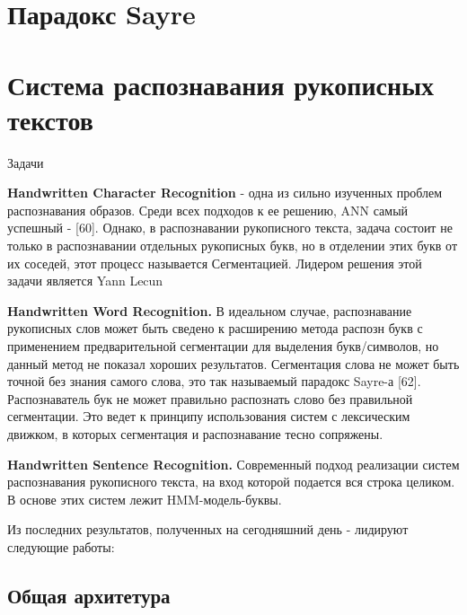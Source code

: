 \section*{Парадокс Sayre}

\section*{Система распознавания рукописных текстов}

Задачи

\textbf{Handwritten Character Recognition} - одна из сильно изученных проблем распознавания образов. Среди всех подходов к ее решению, ANN самый успешный - [60]. Однако, в распознавании рукописного текста, задача состоит не только в распознавании отдельных рукописных букв, но в отделении этих букв от их соседей, этот процесс называется Сегментацией.
Лидером решения этой задачи является Yann Lecun

\textbf{Handwritten Word Recognition.} В идеальном случае, распознавание рукописных слов может быть сведено к расширению метода распозн букв с применением предварительной сегментации для выделения букв/символов, но данный метод не показал хороших результатов. Сегментация слова не может быть точной без знания самого слова, это так называемый парадокс Sayre-а [62].  Распознаватель бук не может правильно распознать слово без правильной сегментации. Это ведет к принципу использования систем с лексическим движком, в которых сегментация и распознавание тесно сопряжены.

\textbf{Handwritten Sentence Recognition.} \cite{frinken2014novel} Современный подход реализации систем распознавания рукописного текста, на вход которой подается вся строка целиком. В основе этих систем лежит HMM-модель-буквы.


Из последних результатов, полученных на сегодняшний день - лидируют следующие работы:
\cite{graves2009novel}

\cite{espana2011improving, zamora2014neural}

\cite{kozielski2013improvements, frinken2014novel, kozielski2014multilingual, pham2014dropout}

\cite{frinken2011co}

\subsection*{Общая архитетура}

